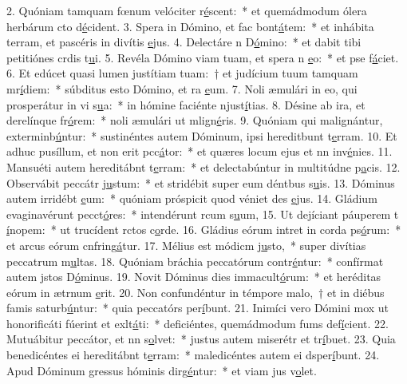 2. Quóniam tamquam fœnum velóciter r\uline{é}scent:~* et quemádmodum ólera herbárum cto d\uline{é}cident.
3. Spera in Dómino, et fac bont\uline{á}tem:~* et inhábita terram, et pascéris in divítis \uline{e}jus.
4. Delectáre n D\uline{ó}mino:~* et dabit tibi petitiónes crdis t\uline{u}i.
5. Revéla Dómino viam tuam, et spera n \uline{e}o:~* et pse f\uline{á}ciet.
6. Et edúcet quasi lumen justítiam tuam:~† et judícium tuum tamquam mr\uline{í}diem:~* súbditus esto Dómino, et ra \uline{e}um.
7. Noli æmulári in eo, qui prosperátur in vi s\uline{u}a:~* in hómine faciénte njust\uline{í}tias.
8. Désine ab ira, et derelínque fr\uline{ó}rem:~* noli æmulári ut mlign\uline{é}ris.
9. Quóniam qui malignántur, exterminb\uline{ú}ntur:~* sustinéntes autem Dóminum, ipsi hereditbunt t\uline{e}rram.
10. Et adhuc pusíllum, et non erit pcc\uline{á}tor:~* et quæres locum ejus et nn inv\uline{é}nies.
11. Mansuéti autem hereditábnt t\uline{e}rram:~* et delectabúntur in multitúdne p\uline{a}cis.
12. Observábit peccátr j\uline{u}stum:~* et stridébit super eum déntbus s\uline{u}is.
13. Dóminus autem irridébt \uline{e}um:~* quóniam próspicit quod véniet des \uline{e}jus.
14. Gládium evaginavérunt pecct\uline{ó}res:~* intendérunt rcum s\uline{u}um,
15. Ut dejíciant páuperem t \uline{í}nopem:~* ut trucídent rctos c\uline{o}rde.
16. Gládius eórum intret in corda ps\uline{ó}rum:~* et arcus eórum cnfring\uline{á}tur.
17. Mélius est módicm j\uline{u}sto,~* super divítias peccatrum m\uline{u}ltas.
18. Quóniam bráchia peccatórum contr\uline{é}ntur:~* confírmat autem jstos D\uline{ó}minus.
19. Novit Dóminus dies immacult\uline{ó}rum:~* et heréditas eórum in ætrnum \uline{e}rit.
20. Non confundéntur in témpore malo,~† et in diébus famis saturb\uline{ú}ntur:~* quia peccatórs per\uline{í}bunt.
21. Inimíci vero Dómini mox ut honorificáti fúerint et exlt\uline{á}ti:~* deficiéntes, quemádmodum fums def\uline{í}cient.
22. Mutuábitur peccátor, et nn s\uline{o}lvet:~* justus autem miserétr et tr\uline{í}buet.
23. Quia benedicéntes ei hereditábnt t\uline{e}rram:~* maledicéntes autem ei dsper\uline{í}bunt.
24. Apud Dóminum gressus hóminis dirg\uline{é}ntur:~* et viam jus v\uline{o}let.
